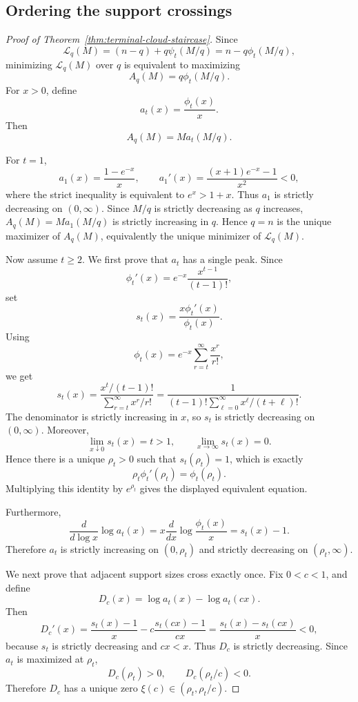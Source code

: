 \documentclass[11pt]{article}
\theoremstyle{definition}
\theoremstyle{remark}
\newcommand{\1}{\mathbf 1}
\begin{document}
\subsection{Ordering the support crossings}
\begin{proof}[Proof of Theorem~\ref{thm:terminal-cloud-staircase}]
Since
\[
  \mathcal L_q(M)=(n-q)+q\psi_t(M/q)=n-q\phi_t(M/q),
\]
minimizing \(\mathcal L_q(M)\) over \(q\) is equivalent to maximizing
\[
  A_q(M)=q\phi_t(M/q).
\]
For \(x>0\), define
\[
  a_t(x)=\frac{\phi_t(x)}{x}.
\]
Then
\[
  A_q(M)=M a_t(M/q).
\]

For \(t=1\),
\[
  a_1(x)=\frac{1-e^{-x}}{x},
  \qquad
  a_1'(x)=\frac{(x+1)e^{-x}-1}{x^2}<0,
\]
where the strict inequality is equivalent to \(e^x>1+x\).  Thus
\(a_1\) is strictly decreasing on \((0,\infty)\).  Since \(M/q\) is
strictly decreasing as \(q\) increases, \(A_q(M)=M a_1(M/q)\) is strictly increasing in \(q\).  Hence \(q=n\) is the unique maximizer of \(A_q(M)\), equivalently the unique minimizer of \(\mathcal L_q(M)\).

Now assume \(t\ge2\).  We first prove that \(a_t\) has a single peak.  Since
\[
  \phi_t'(x)=e^{-x}\frac{x^{t-1}}{(t-1)!},
\]
set
\[
  s_t(x)=\frac{x\phi_t'(x)}{\phi_t(x)}.
\]
Using
\[
  \phi_t(x)=e^{-x}\sum_{r=t}^{\infty}\frac{x^r}{r!},
\]
we get
\[
  s_t(x)
  =\frac{x^t/(t-1)!}{\sum_{r=t}^{\infty}x^r/r!}
  =\frac{1}{(t-1)!\sum_{\ell=0}^{\infty}x^\ell/(t+\ell)!}.
\]
The denominator is strictly increasing in \(x\), so \(s_t\) is strictly decreasing on \((0,\infty)\).  Moreover,
\[
  \lim_{x\downarrow0}s_t(x)=t>1,
  \qquad
  \lim_{x\to\infty}s_t(x)=0.
\]
Hence there is a unique \(\rho_t>0\) such that \(s_t(\rho_t)=1\), which is exactly
\[
  \rho_t\phi_t'(\rho_t)=\phi_t(\rho_t).
\]
Multiplying this identity by \(e^{\rho_t}\) gives the displayed equivalent equation.

Furthermore,
\[
  \frac{d}{d\log x}\log a_t(x)
  =
  x\frac{d}{dx}\log\frac{\phi_t(x)}{x}
  =s_t(x)-1.
\]
Therefore \(a_t\) is strictly increasing on \((0,\rho_t)\) and strictly decreasing on \((\rho_t,\infty)\).

We next prove that adjacent support sizes cross exactly once.  Fix \(0<c<1\), and define
\[
  D_c(x)=\log a_t(x)-\log a_t(cx).
\]
Then
\[
  D_c'(x)
  =\frac{s_t(x)-1}{x}-c\frac{s_t(cx)-1}{cx}
  =\frac{s_t(x)-s_t(cx)}{x}<0,
\]
because \(s_t\) is strictly decreasing and \(cx<x\).  Thus \(D_c\) is strictly decreasing.  Since \(a_t\) is maximized at \(\rho_t\),
\[
  D_c(\rho_t)>0,
  \qquad
  D_c(\rho_t/c)<0.
\]
Therefore \(D_c\) has a unique zero \(\xi(c)\in(\rho_t,\rho_t/c)\).


\end{proof}
\end{document}
